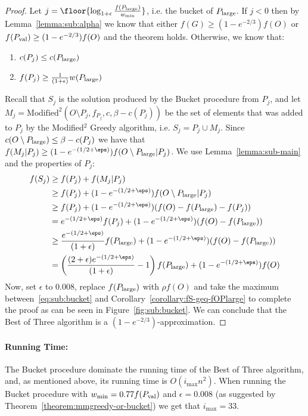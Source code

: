 \begin{proof}
	Let $j = \floor{\log_{1 + \epsilon}\frac{f(\pLarge)}{w_{\min}}}$, i.e. the bucket of $P_{\text{large}}$.
	If $j < 0$ then by Lemma~\ref{lemma:sub:alpha} we know that either $f(G) \geq (1 - e^{-2/3})f(O)$ or $f(P_{\text{val}}) \geq (1 - e^{-2/3})f(O)$ and the theorem holds.
	Otherwise, we know that:
	\begin{enumerate}
		\item $c(P_j) \leq c(P_{\text{large}})$
		\item $f(P_j) \geq \frac{1}{(1 + \epsilon)}w(P_{\text{large}})$
	\end{enumerate}
	Recall that $S_{j}$ is the solution produced by the Bucket procedure from $P_j$, and let $M_j = \text{Modified}^2(O \setminus P_j, f_{P_j}, c, \beta - c(P_j))$ be the set of elements that was added to $P_j$ by the Modified$^2$ Greedy algorithm, i.e. $S_j = P_j \cup M_j$.
	Since $c(O \setminus P_{\text{large}}) \leq \beta - c(P_j)$ we have that $f(M_j|P_j) \geq (1-e^{-(1/2 + \eps)})f(O \setminus \pLarge | P_j)$.
	We use Lemma~\ref{lemma:sub-main} and the properties of $P_j$:
	\begin{align}
		f(S_{j}) 
		&
		\geq f(P_j) + f(M_j|P_j)
		\\ & 
		\geq f(P_j) + (1-e^{-(1/2 + \eps)})f(O \setminus \pLarge | P_j)
		\\ & 
		\geq f(P_j) + (1-e^{-(1/2 + \eps)})(f(O) - f(\pLarge) - f(P_j))
		\\ & 
		= e^{-(1/2 + \eps)}f(P_j) + (1-e^{-(1/2 + \eps)})(f(O) - f(\pLarge))
		\\ & 
		\geq \frac{e^{-(1/2 + \eps)}}{(1 + \epsilon)}f(\pLarge) + (1-e^{-(1/2 + \eps)})(f(O) - f(\pLarge))
		\\ &
		= \left(
			\frac{(2 + \epsilon)e^{-(1/2 + \eps)}}{(1 + \epsilon)} - 1
		\right)
		f(\pLarge)
		+ (1-e^{-(1/2 + \eps)})f(O)
		\label{eq:sub:bucket}
	\end{align}
	Now, set $\epsilon$ to $0.008$, replace $f(P_{\text{large}})$ with $\rho f(O)$ and take the maximum between~\ref{eq:sub:bucket} and Corollary~\ref{corollary:fS-geq-fOPlarge} to complete the proof as can be seen in Figure~\ref{fig:sub:bucket}.
	We can conclude that the Best of Three algorithm is a $(1 - e^{-2/3})$-approximation.
\end{proof}


\paragraph{Running Time:}
The Bucket procedure dominate the running time of the Best of Three algorithm, and, as mentioned above, its running time is $O(i_{\max}n^2)$.
When running the Bucket procedure with $w_{\min} = 0.77f(P_{\text{val}})$ and $\epsilon = 0.008$ (as suggested by Theorem~\ref{theorem:mmgreedy-or-bucket}) we get that $i_{\max} = 33$.

